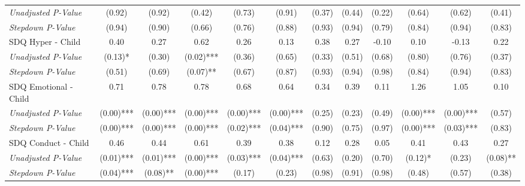 \begin{tabular}{l c c c c c c c c c c c}
\quad \textit{Unadjusted P-Value} & (0.92) & (0.92) & (0.42) & (0.73) & (0.91) & (0.37) & (0.44) & (0.22) & (0.64) & (0.62) & (0.41) \\
\quad \textit{Stepdown P-Value} & (0.94) & (0.90) & (0.66) & (0.76) & (0.88) & (0.93) & (0.94) & (0.79) & (0.84) & (0.94) & (0.83) \\
SDQ Hyper - Child & 0.40 & 0.27 & 0.62 & 0.26 & 0.13 & 0.38 & 0.27 & -0.10 & 0.10 & -0.13 & 0.22 \\
\quad \textit{Unadjusted P-Value} & (0.13)* & (0.30) & (0.02)*** & (0.36) & (0.65) & (0.33) & (0.51) & (0.68) & (0.80) & (0.76) & (0.37) \\
\quad \textit{Stepdown P-Value} & (0.51) & (0.69) & (0.07)** & (0.67) & (0.87) & (0.93) & (0.94) & (0.98) & (0.84) & (0.94) & (0.83) \\
SDQ Emotional - Child & 0.71 & 0.78 & 0.78 & 0.68 & 0.64 & 0.34 & 0.39 & 0.11 & 1.26 & 1.05 & 0.10 \\
\quad \textit{Unadjusted P-Value} & (0.00)*** & (0.00)*** & (0.00)*** & (0.00)*** & (0.00)*** & (0.25) & (0.23) & (0.49) & (0.00)*** & (0.00)*** & (0.57) \\
\quad \textit{Stepdown P-Value} & (0.00)*** & (0.00)*** & (0.00)*** & (0.02)*** & (0.04)*** & (0.90) & (0.75) & (0.97) & (0.00)*** & (0.03)*** & (0.83) \\
SDQ Conduct - Child & 0.46 & 0.44 & 0.61 & 0.39 & 0.38 & 0.12 & 0.28 & 0.05 & 0.41 & 0.43 & 0.27 \\
\quad \textit{Unadjusted P-Value} & (0.01)*** & (0.01)*** & (0.00)*** & (0.03)*** & (0.04)*** & (0.63) & (0.20) & (0.70) & (0.12)* & (0.23) & (0.08)** \\
\quad \textit{Stepdown P-Value} & (0.04)*** & (0.08)** & (0.00)*** & (0.17) & (0.23) & (0.98) & (0.91) & (0.98) & (0.48) & (0.57) & (0.38) \\
\bottomrule
\end{tabular}
